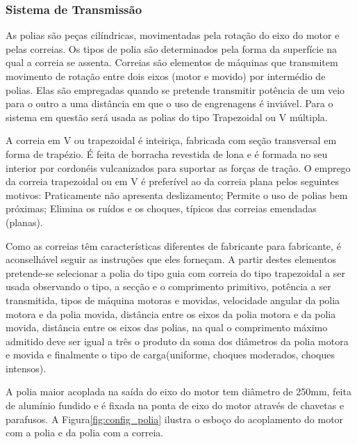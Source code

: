 \subsubsection*{\textbf{Sistema de Transmissão}}


    As polias são peças cilíndricas, movimentadas pela rotação do eixo do motor e pelas correias. Os tipos de polia são determinados pela forma da superfície na qual a correia se assenta. Correias são elementos de máquinas que transmitem movimento de rotação entre dois eixos (motor e movido) por intermédio de polias. Elas são empregadas quando se pretende transmitir potência de um veio para o outro a uma distância em que o uso de engrenagens é inviável. Para o sistema em questão será usada as polias do tipo Trapezoidal ou V múltipla.

    A correia em V ou trapezoidal é inteiriça, fabricada com seção transversal em forma de trapézio. É feita de borracha revestida de lona e é formada no seu interior por cordonéis vulcanizados para suportar as forças de tração. O emprego da correia trapezoidal ou em V é preferível ao da correia plana pelos seguintes motivos: Praticamente não apresenta deslizamento; Permite o uso de polias bem próximas; Elimina os ruídos e os choques, típicos das correias emendadas (planas).

    Como as correias têm características diferentes de fabricante para fabricante, é aconselhável seguir as instruções que eles forneçam. A partir destes elementos pretende-se selecionar a polia do tipo guia com correia do tipo trapezoidal a ser usada observando o tipo, a secção e o comprimento primitivo, potência a ser transmitida, tipos de máquina motoras e movidas, velocidade angular da polia motora e da polia movida, distância entre os eixos da polia motora e da polia movida, distância entre os eixos das polias, na qual o comprimento máximo admitido deve ser igual a três o produto da soma dos diâmetros da polia motora e movida e finalmente o tipo de carga(uniforme, choques moderados, choques intensos).

    A polia maior acoplada na saída do eixo do motor tem diâmetro de 250mm, feita de alumínio fundido e é fixada na ponta de eixo do motor através de chavetas e parafusos. A Figura\ref{fig:config_polia} ilustra o esboço do acoplamento do motor com a polia e da polia com a correia.

\vfill

